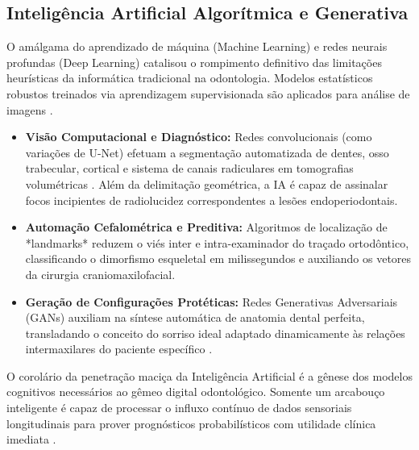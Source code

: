 \subsection{Inteligência Artificial Algorítmica e Generativa}
\label{subsec:ia}

O amálgama do aprendizado de máquina (Machine Learning) e redes neurais profundas (Deep Learning) catalisou o rompimento definitivo das limitações heurísticas da informática tradicional na odontologia. Modelos estatísticos robustos treinados via aprendizagem supervisionada são aplicados para análise de imagens \cite{elsaid2025digital}.

\begin{itemize}
    \item \textbf{Visão Computacional e Diagnóstico:} Redes convolucionais (como variações de U-Net) efetuam a segmentação automatizada de dentes, osso trabecular, cortical e sistema de canais radiculares em tomografias volumétricas \cite{bdj2026predictive}. Além da delimitação geométrica, a IA é capaz de assinalar focos incipientes de radiolucidez correspondentes a lesões endoperiodontais.
    \item \textbf{Automação Cefalométrica e Preditiva:} Algoritmos de localização de *landmarks* reduzem o viés inter e intra-examinador do traçado ortodôntico, classificando o dimorfismo esqueletal em milissegundos e auxiliando os vetores da cirurgia craniomaxilofacial.
    \item \textbf{Geração de Configurações Protéticas:} Redes Generativas Adversariais (GANs) auxiliam na síntese automática de anatomia dental perfeita, transladando o conceito do sorriso ideal adaptado dinamicamente às relações intermaxilares do paciente específico \cite{roy2025applications}.
\end{itemize}

O corolário da penetração maciça da Inteligência Artificial é a gênese dos modelos cognitivos necessários ao gêmeo digital odontológico. Somente um arcabouço inteligente é capaz de processar o influxo contínuo de dados sensoriais longitudinais para prover prognósticos probabilísticos com utilidade clínica imediata \cite{katsoulakis2024digital}.
